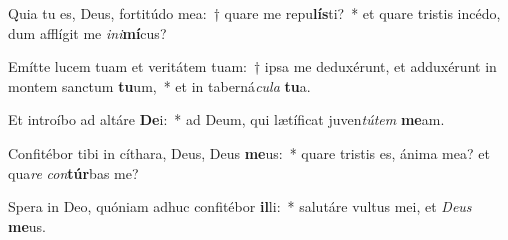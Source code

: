 \item Quia tu es, Deus, fortitúdo mea:~† quare me repu\textbf{lís}ti?~* et quare tristis incédo, dum afflígit me \textit{in}\textit{i}\textbf{mí}cus?
\item Emítte lucem tuam et veritátem tuam:~† ipsa me deduxérunt, et adduxérunt in montem sanctum \textbf{tu}um,~* et in taberná\textit{cu}\textit{la} \textbf{tu}a.
\item Et introíbo ad altáre \textbf{De}i:~* ad Deum, qui lætíficat juven\textit{tú}\textit{tem} \textbf{me}am.
\item Confitébor tibi in cíthara, Deus, Deus \textbf{me}us:~* quare tristis es, ánima mea? et qua\textit{re} \textit{con}\textbf{túr}bas me?
\item Spera in Deo, quóniam adhuc confitébor \textbf{il}li:~* salutáre vultus mei, et \textit{De}\textit{us} \textbf{me}us.
